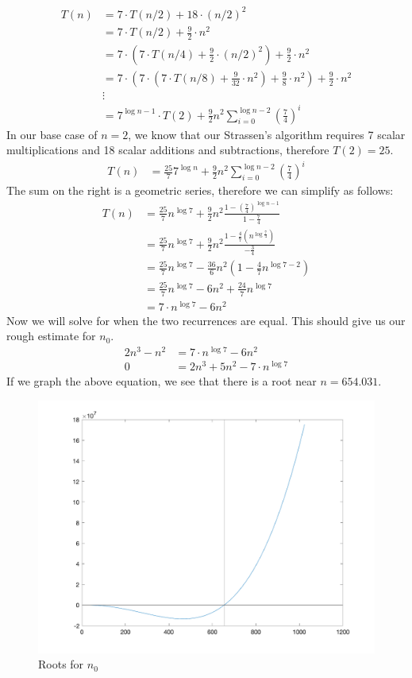 \documentclass{article}
\begin{document}
\begin{align*}
    T(n) &= 7 \cdot T(n/2) + 18 \cdot (n/2)^2 \\
    &= 7 \cdot T(n/2) + \frac{9}{2} \cdot n^2 \\
    &= 7 \cdot (7 \cdot T(n/4) + \frac{9}{2} \cdot (n/2)^2) + \frac{9}{2} \cdot n^2 \\
    &= 7 \cdot (7 \cdot (7 \cdot T(n/8) + \frac{9}{32} \cdot n^2) + \frac{9}{8} \cdot n^2) + \frac{9}{2} \cdot n^2 \\
    &\vdots \\
    &= 7^{\log n - 1} \cdot T(2) + \frac{9}{2}n^2 \sum_{i=0}^{\log n - 2} (\frac{7}{4})^i
\end{align*}
In our base case of $n=2$, we know that our Strassen's algorithm requires 7 scalar multiplications and 18 scalar additions and subtractions, therefore $T(2)=25$.
\begin{align*}
    T(n) &= \frac{25}{7} 7^{\log n} + \frac{9}{2}n^2 \sum_{i=0}^{\log n - 2} (\frac{7}{4})^i
\end{align*}
The sum on the right is a geometric series, therefore we can simplify as follows:
\begin{align*}
    T(n) &= \frac{25}{7} n^{\log 7} + \frac{9}{2}n^2 \frac{1-(\frac{7}{4})^{\log n - 1}}{1-\frac{7}{4}}\\
    &= \frac{25}{7} n^{\log 7} + \frac{9}{2}n^2 \frac{1-\frac{4}{7}(n^{\log \frac{7}{4}})}{-\frac{3}{4}}\\
    &= \frac{25}{7} n^{\log 7} - \frac{36}{6}n^2 (1-\frac{4}{7}n^{\log 7 - 2})\\
    &= \frac{25}{7} n^{\log 7} - 6n^2 + \frac{24}{7}n^{\log 7}\\
    &= 7\cdot n^{\log 7} - 6n^2
\end{align*}
Now we will solve for when the two recurrences are equal. This should give us our rough estimate for $n_0$.
\begin{align*}
    2n^{3} - n^2 &= 7\cdot n^{\log 7} - 6n^2 \\
    0 &= 2n^{3} + 5n^2 - 7\cdot n^{\log 7}
\end{align*}
If we graph the above equation, we see that there is a root near $n=654.031$.
\begin{figure}[htp]
    \centering
    \includegraphics[width=12cm]{root.png}
    \caption{Roots for $n_0$}
    \label{fig:galaxy}
\end{figure}
\end{document}
